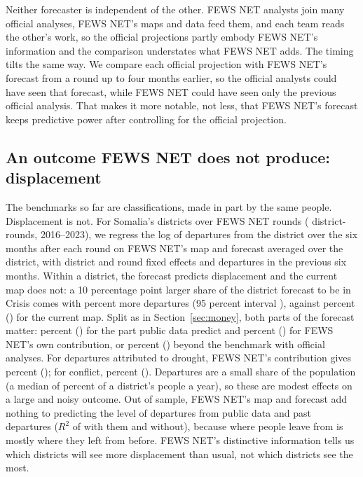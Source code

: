 \documentclass[11pt]{article}
\begin{document}
Neither forecaster is independent of the other. FEWS NET analysts join many official analyses, FEWS NET's maps and data feed them, and each team reads the other's work, so the official projections partly embody FEWS NET's information and the comparison understates what FEWS NET adds. The timing tilts the same way. We compare each official projection with FEWS NET's forecast from a round up to four months earlier, so the official analysts could have seen that forecast, while FEWS NET could have seen only the previous official analysis. That makes it more notable, not less, that FEWS NET's forecast keeps predictive power after controlling for the official projection.

\subsection{An outcome FEWS NET does not produce: displacement}

The benchmarks so far are classifications, made in part by the same people. Displacement is not. For Somalia's \dispDistricts{} districts over \dispRounds{} FEWS NET rounds (\dispN{} district-rounds, 2016--2023), we regress the log of departures from the district over the six months after each round on FEWS NET's map and forecast averaged over the district, with district and round fixed effects and departures in the previous six months. Within a district, the forecast predicts displacement and the current map does not: a 10 percentage point larger share of the district forecast to be in Crisis comes with \dispAllFc{} percent more departures (95 percent interval \dispAllFcCi{}), against \dispAllCur{} percent (\dispAllCurCi{}) for the current map. Split as in Section~\ref{sec:money}, both parts of the forecast matter: \dispAllBase{} percent (\dispAllBaseCi{}) for the part public data predict and \dispAllContrib{} percent (\dispAllContribCi{}) for FEWS NET's own contribution, or \dispAllContribIpc{} percent (\dispAllContribIpcCi{}) beyond the benchmark with official analyses. For departures attributed to drought, FEWS NET's contribution gives \dispDroughtContrib{} percent (\dispDroughtContribCi{}); for conflict, \dispConflictContrib{} percent (\dispConflictContribCi{}). Departures are a small share of the population (a median of \dispMedShare{} percent of a district's people a year), so these are modest effects on a large and noisy outcome. Out of sample, FEWS NET's map and forecast add nothing to predicting the level of departures from public data and past departures ($R^2$ of \dispAllRtwoFews{} with them and \dispAllRtwoPub{} without), because where people leave from is mostly where they left from before. FEWS NET's distinctive information tells us which districts will see more displacement than usual, not which districts see the most.
\end{document}
